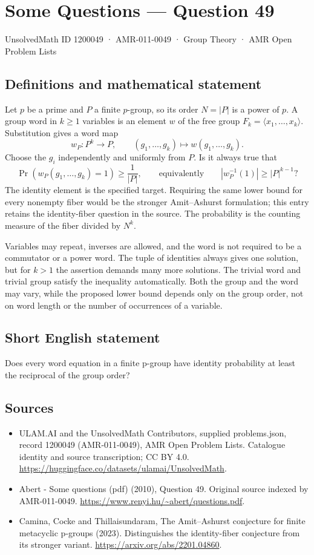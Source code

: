 \documentclass[11pt,a4paper]{article}
\begin{document}
\section*{Some Questions — Question 49}\label{1200049}
{\small UnsolvedMath ID 1200049 · AMR-011-0049 · Group Theory · AMR Open Problem Lists}
\subsection{Definitions and mathematical statement}
Let $p$ be a prime and $P$ a finite $p$-group, so its order $N=|P|$ is a power of $p$. A group word in $k\geq1$ variables is an element $w$ of the free group $F_k=\langle x_1,\ldots,x_k\rangle$. Substitution gives a word map
\[
 w_P:P^k\longrightarrow P,\qquad
 (g_1,\ldots,g_k)\longmapsto w(g_1,\ldots,g_k).
\]
Choose the $g_i$ independently and uniformly from $P$. Is it always true that
\[
 \Pr(w_P(g_1,\ldots,g_k)=1)\geq\frac1{|P|},
 \qquad\text{equivalently}\qquad |w_P^{-1}(1)|\geq |P|^{k-1}?
\]
The identity element is the specified target. Requiring the same lower bound for every nonempty fiber would be the stronger Amit--Ashurst formulation; this entry retains the identity-fiber question in the source. The probability is the counting measure of the fiber divided by $N^k$.

Variables may repeat, inverses are allowed, and the word is not required to be a commutator or a power word. The tuple of identities always gives one solution, but for $k>1$ the assertion demands many more solutions. The trivial word and trivial group satisfy the inequality automatically. Both the group and the word may vary, while the proposed lower bound depends only on the group order, not on word length or the number of occurrences of a variable.
\subsection{Short English statement}
Does every word equation in a finite p-group have identity probability at least the reciprocal of the group order?
\subsection{Sources}
\begin{itemize}
\item[S1] ULAM.AI and the UnsolvedMath Contributors, supplied problems.json, record 1200049 (AMR-011-0049), AMR Open Problem Lists. Catalogue identity and source transcription; CC BY 4.0.
\url{https://huggingface.co/datasets/ulamai/UnsolvedMath}.
\item[S2] Abert - Some questions (pdf) (2010), Question 49. Original source indexed by AMR-011-0049.
\url{https://www.renyi.hu/~abert/questions.pdf}.
\item[S3] Camina, Cocke and Thillaisundaram, The Amit--Ashurst conjecture for finite metacyclic p-groups (2023). Distinguishes the identity-fiber conjecture from its stronger variant.
\url{https://arxiv.org/abs/2201.04860}.
\end{itemize}
\end{document}
